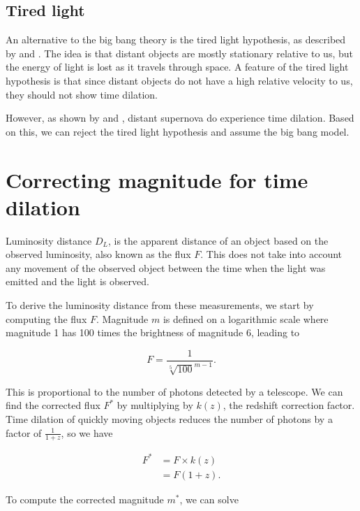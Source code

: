 \documentclass{article}
\begin{document}
\subsection{Tired light}

An alternative to the big bang theory is the tired light hypothesis, as
described by \citet{zwicky1929} and \citet{shao2013}. The idea is that distant
objects are mostly stationary relative to us, but the energy of light is lost
as it travels through space. A feature of the tired light hypothesis is that
since distant objects do not have a high relative velocity to us, they should
not show time dilation.

However, as shown by \citet{blonden2008} and \citet{white2024}, distant
supernova do experience time dilation. Based on this, we can reject the tired
light hypothesis and assume the big bang model.

\section{Correcting magnitude for time dilation}

Luminosity distance $D_L$, is the apparent distance of an object based on the
observed luminosity, also known as the flux $F$. This does not take into
account any movement of the observed object between the time when the light was
emitted and the light is observed.

To derive the luminosity distance from these measurements, we start
by computing the flux $F$. Magnitude $m$ is defined on a logarithmic scale
where magnitude 1 has 100 times the brightness of magnitude 6, leading to

\begin{equation}
  F = \frac{1}{\sqrt[5]{100}^{m - 1}}.
\end{equation}

This is proportional to the number of photons detected by a telescope. We can
find the corrected flux $F^*$ by multiplying by $k(z)$, the redshift correction
factor. Time dilation of quickly moving objects reduces the number of photons
by a factor of $\frac{1}{1 + z}$, so we have

\begin{equation}
\begin{aligned}
  F^* &= F \times k(z) \\
      &= F (1 + z).
\end{aligned}
\end{equation}

To compute the corrected magnitude $m^*$, we can solve
\end{document}
